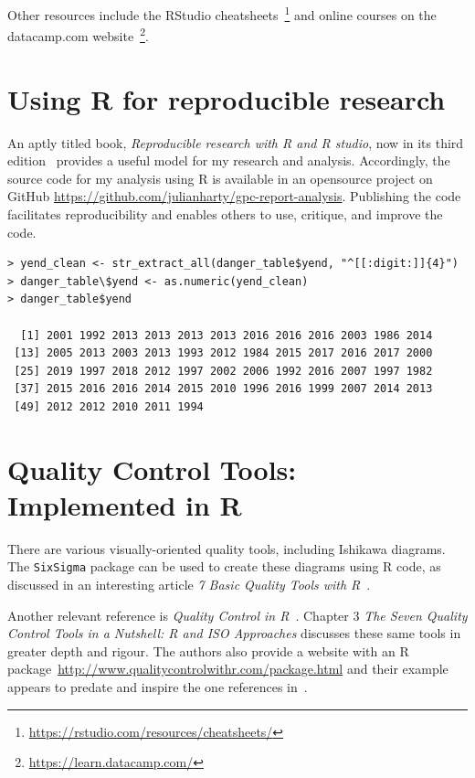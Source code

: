 Other resources include the RStudio cheatsheets~\footnote{\url{https://rstudio.com/resources/cheatsheets/}} and online courses on the datacamp.com website~\footnote{\url{https://learn.datacamp.com/}}.

\section{Using R for reproducible research}
An aptly titled book, \emph{Reproducible research with R and R studio}, now in its third edition~\cite{gandrud2020reproducible} provides a useful model for my research and analysis. Accordingly, the source code for my analysis using R is available in an opensource project on GitHub \url{https://github.com/julianharty/gpc-report-analysis}. Publishing the code facilitates reproducibility and enables others to use, critique, and improve the code.

\begin{lstlisting}[caption=Parsing dates from Wikipedia content,label=listing:parse_dates]
> yend_clean <- str_extract_all(danger_table$yend, "^[[:digit:]]{4}")
> danger_table\$yend <- as.numeric(yend_clean)
> danger_table$yend

  [1] 2001 1992 2013 2013 2013 2013 2016 2016 2016 2003 1986 2014
 [13] 2005 2013 2003 2013 1993 2012 1984 2015 2017 2016 2017 2000 
 [25] 2019 1997 2018 2012 1997 2002 2006 1992 2016 2007 1997 1982
 [37] 2015 2016 2016 2014 2015 2010 1996 2016 1999 2007 2014 2013
 [49] 2012 2012 2010 2011 1994
\end{lstlisting}

\section{Quality Control Tools: Implemented in R}
There are various visually-oriented quality tools, including Ishikawa diagrams. The \texttt{SixSigma} package can be used to create these diagrams using R code, as discussed in an interesting article \emph{7 Basic Quality Tools with R}~\cite{7_basic_quality_tools_with_R}.

Another relevant reference is \emph{Quality Control in R}~\cite{quality_control_in_R_book}. Chapter 3 \emph{The Seven Quality Control Tools in a Nutshell: R and ISO Approaches} discusses these same tools in greater depth and rigour. The authors also provide a website with an R package~\url{http://www.qualitycontrolwithr.com/package.html} and their example appears to predate and inspire the one references in~\cite{7_basic_quality_tools_with_R}.


